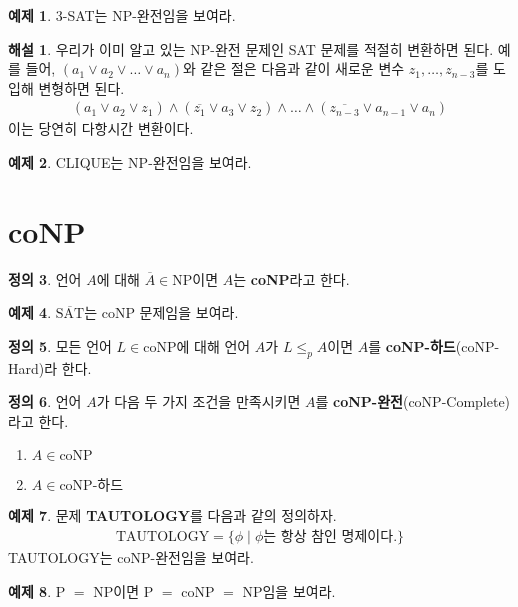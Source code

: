 \documentclass[b5paper, 11pt]{book}
\theoremstyle{definition}
\newtheorem{defn}{정의}[chapter]
\newtheorem{ex}[defn]{예제}
\newtheorem*{ans*}{해설}
\begin{document}
\begin{ex}
    3-SAT는 NP-완전임을 보여라.
\end{ex}
\begin{ans*}
    우리가 이미 알고 있는 NP-완전 문제인 SAT 문제를 적절히 변환하면 된다. 예를 들어, $(a_1 \vee a_2 \vee \ldots \vee a_n)$와
    같은 절은 다음과 같이 새로운 변수 $z_1, \ldots, z_{n-3}$를 도입해 변형하면 된다.
    \begin{align*}
        (a_1 \vee a_2 \vee z_1) \wedge (\overline{z_1} \vee a_3 \vee z_2) \wedge \ldots \wedge (\overline{z_{n-3}} \vee a_{n-1} \vee a_{n})
    \end{align*}
    이는 당연히 다항시간 변환이다.
\end{ans*}
\begin{ex}
    CLIQUE는 NP-완전임을 보여라.
\end{ex}
\section{coNP}
\begin{defn}
    언어 $A$에 대해 $\overline{A} \in \text{NP}$이면 $A$는 \textbf{coNP}라고 한다.   
\end{defn}
\begin{ex}
    $\overline{\text{SAT}}$는 coNP 문제임을 보여라.
\end{ex}
\begin{defn}
    모든 언어 $L \in \text{coNP}$에 대해 언어 $A$가 $L \le_p A$이면 $A$를 
    \textbf{coNP-하드}(coNP-Hard)라 한다.
\end{defn}
\begin{defn}
    언어 $A$가 다음 두 가지 조건을 만족시키면 $A$를 \textbf{coNP-완전}(coNP-Complete)라고 한다.
    \begin{enumerate}
        \item $A \in \text{coNP}$
        \item $A \in \text{coNP-하드}$
    \end{enumerate}
\end{defn}
\begin{ex}
    문제 \textbf{TAUTOLOGY}를 다음과 같의 정의하자. 
    \begin{align*}
        \text{TAUTOLOGY} = \{ \phi \;\vert\; \phi \text{는 항상 참인 명제이다.}\}
    \end{align*}
    TAUTOLOGY는 coNP-완전임을 보여라.
\end{ex}
\begin{ex}
    P $=$ NP이면 P $=$ coNP $=$ NP임을 보여라.
\end{ex}
\end{document}

